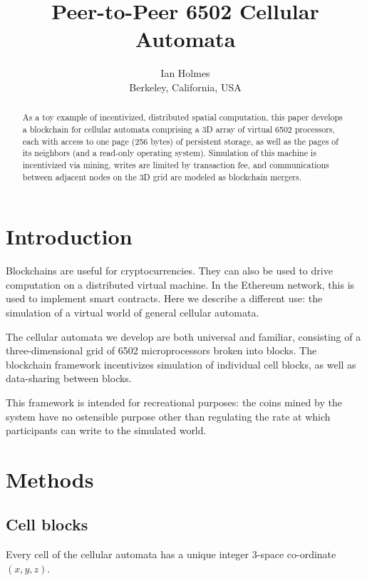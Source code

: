 \documentclass{article}
\begin{document}
\title{Peer-to-Peer 6502 Cellular Automata}
\author{Ian Holmes \\ Berkeley, California, USA}

\maketitle


\begin{abstract}
  As a toy example of incentivized, distributed spatial computation,
  this paper develops a blockchain for cellular automata
  comprising a 3D array of virtual 6502 processors, each with access to one page (256 bytes) of persistent storage,
  as well as the pages of its neighbors (and a read-only operating system).
  Simulation of this machine is incentivized via mining,
  writes are limited by transaction fee,
  and communications between adjacent nodes on the 3D grid are modeled as blockchain mergers.
\end{abstract}

\section{Introduction}

Blockchains are useful for cryptocurrencies.
They can also be used to drive computation on a distributed virtual machine.
In the Ethereum network, this is used to implement smart contracts.
Here we describe a different use: the simulation of a virtual world of general cellular automata.

The cellular automata we develop are both universal and familiar, consisting of a three-dimensional grid of 6502 microprocessors broken into blocks.
The blockchain framework incentivizes simulation of individual cell blocks, as well as data-sharing between blocks.

This framework is intended for recreational purposes: the coins mined by the system
have no ostensible purpose other than regulating the rate at which participants can write to the simulated world.

\section{Methods}

\subsection{Cell blocks}

Every cell of the cellular automata has a unique integer 3-space co-ordinate $(x,y,z)$.
\end{document}
